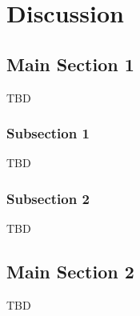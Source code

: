 
\chapter{Discussion} %



\section{Main Section 1}

TBD

\subsection{Subsection 1}

TBD


\subsection{Subsection 2}

TBD



\section{Main Section 2}

TBD